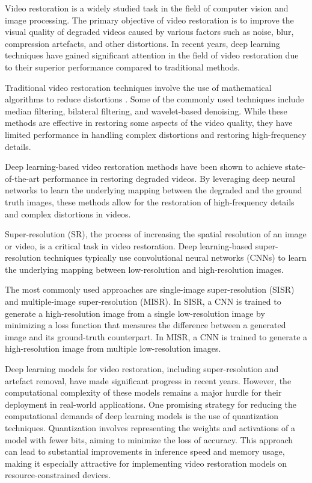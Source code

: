 \label{chap:Introduction}

Video restoration is a widely studied task in the field of computer vision and image processing. The primary objective of video restoration is to improve the visual quality of degraded videos caused by various factors such as noise, blur, compression artefacts, and other distortions. In recent years, deep learning techniques have gained significant attention in the field of video restoration due to their superior performance compared to traditional methods.

Traditional video restoration techniques involve the use of mathematical algorithms to reduce distortions \cite{fan2019brief}. Some of the commonly used techniques include median filtering, bilateral filtering, and wavelet-based denoising. While these methods are effective in restoring some aspects of the video quality, they have limited performance in handling complex distortions and restoring high-frequency details.

Deep learning-based video restoration methods have been shown to achieve state-of-the-art performance in restoring degraded videos. By leveraging deep neural networks to learn the underlying mapping between the degraded and the ground truth images, these methods allow for the restoration of high-frequency details and complex distortions in videos.

Super-resolution (SR), the process of increasing the spatial resolution of an image or video, is a critical task in video restoration. Deep learning-based super-resolution techniques typically use convolutional neural networks (CNNs) to learn the underlying mapping between low-resolution and high-resolution images.

The most commonly used approaches are single-image super-resolution (SISR) and multiple-image super-resolution (MISR). In SISR, a CNN is trained to generate a high-resolution image from a single low-resolution image by minimizing a loss function that measures the difference between a generated image and its ground-truth counterpart. In MISR, a CNN is trained to generate a high-resolution image from multiple low-resolution images. 

Deep learning models for video restoration, including super-resolution and artefact removal, have made significant progress in recent years. However, the computational complexity of these models remains a major hurdle for their deployment in real-world applications. One promising strategy for reducing the computational demands of deep learning models is the use of quantization techniques. Quantization involves representing the weights and activations of a model with fewer bits, aiming to minimize the loss of accuracy. This approach can lead to substantial improvements in inference speed and memory usage, making it especially attractive for implementing video restoration models on resource-constrained devices.

